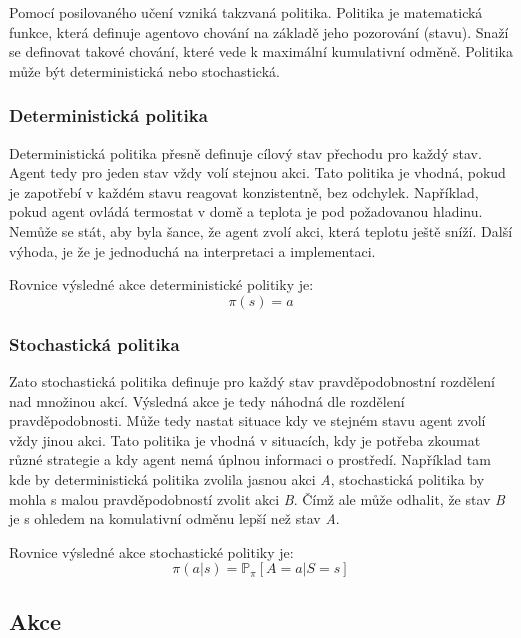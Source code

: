 Pomocí posilovaného učení vzniká takzvaná politika.
Politika je matematická funkce, která definuje agentovo chování na základě jeho pozorování (stavu).
Snaží se definovat takové chování, které vede k maximální kumulativní odměně.
Politika může být deterministická nebo stochastická.

  \subsubsection*{Deterministická politika}
  
  Deterministická politika přesně definuje cílový stav přechodu pro každý stav.
  Agent tedy pro jeden stav vždy volí stejnou akci.
  Tato politika je vhodná, pokud je zapotřebí v každém stavu reagovat konzistentně, bez odchylek.
  Například, pokud agent ovládá termostat v domě a teplota je pod požadovanou hladinu.
  Nemůže se stát, aby byla šance, že agent zvolí akci, která teplotu ještě sníží.
  Další výhoda, je že je jednoduchá na interpretaci a implementaci.\cite{Policies}

  Rovnice výsledné akce deterministické politiky je:
  \begin{equation}
    \pi(s) = a\label{eq:policy_deterministic}
  \end{equation}

  \subsubsection*{Stochastická politika}
  
  Zato stochastická politika definuje pro každý stav pravděpodobnostní rozdělení nad množinou akcí.
  Výsledná akce je tedy náhodná dle rozdělení pravděpodobnosti.
  Může tedy nastat situace kdy ve stejném stavu agent zvolí vždy jinou akci.
  Tato politika je vhodná v situacích, kdy je potřeba zkoumat různé strategie a kdy agent nemá úplnou informaci o prostředí.
  Například tam kde by deterministická politika zvolila jasnou akci \textit{A}, stochastická politika by mohla s malou pravděpodobností zvolit akci \textit{B}.
  Čímž ale může odhalit, že stav \textit{B} je s ohledem na komulativní odměnu lepší než stav \textit{A}.\cite{Policies}

  Rovnice výsledné akce stochastické politiky je:
  \begin{equation}
    \pi(a \vert s) = \mathbb{P}_\pi [A=a \vert S=s]\label{eq:policy_stochastic}
  \end{equation}

\subsection{Akce}\label{subsec:akce}

